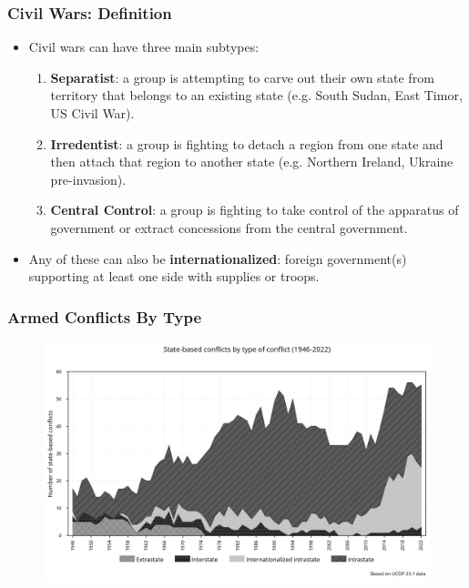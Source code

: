 \documentclass[handout]{beamer}
\begin{document}
\begin{frame} 
	\frametitle{\LARGE{Civil Wars: Definition}}
	\begin{itemize}
		\item Civil wars can have three main subtypes:
		\begin{enumerate}
			\item \textbf{Separatist}: a group is attempting to carve out their own state from territory that belongs to an existing state (e.g. South Sudan, East Timor, US Civil War). \pause
			\item \textbf{Irredentist}: a group is fighting to detach a region from one state and then attach that region to another state (e.g. Northern Ireland, Ukraine pre-invasion). \pause
			\item \textbf{Central Control}: a group is fighting to take control of the apparatus of government or extract concessions from the central government. \pause
		\end{enumerate}
	\item Any of these can also be \textbf{internationalized}: foreign government(s) supporting at least one side with supplies or troops.
	\end{itemize}
\end{frame}

\begin{frame} 
	\frametitle{\LARGE{Armed Conflicts By Type}}
	\begin{figure}[ht!]
		\centering
		\includegraphics[width=\textwidth,height=\textheight,keepaspectratio]{armedconf_by_type.png}
	\end{figure}
\end{frame}
\end{document}
